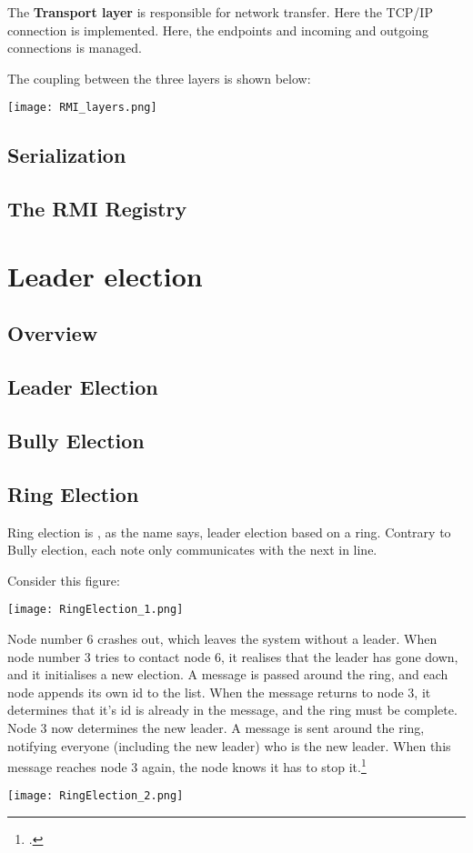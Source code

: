 The \textbf{Transport layer} is responsible for network transfer. Here the TCP/IP connection is implemented. Here, the endpoints and incoming and outgoing connections is managed.

The coupling between the three layers is shown below:

\begin{center}
	\texttt{[image: RMI\_layers.png]}
\end{center}

\subsection{Serialization}

\subsection{The RMI Registry}

\section{Leader election}
\subsection{Overview}

\subsection{Leader Election}

\subsection{Bully Election}

\subsection{Ring Election}
Ring election is , as the name says, leader election based on a ring. Contrary to Bully election, each note only communicates with the next in line.

Consider this figure:

\begin{center}
	\texttt{[image: RingElection\_1.png]}
\end{center}

Node number 6 crashes out, which leaves the system without a leader. When node number 3 tries to contact node 6, it realises that the leader has gone down, and it initialises a new election. A message is passed around the ring, and each node appends its own id to the list. When the message returns to node 3, it determines that it's id is already in the message, and the ring must be complete. Node 3 now determines the new leader. A message is sent around the ring, notifying everyone (including the new leader) who is the new leader. When this message reaches node 3 again, the node knows it has to stop it.\footcite{colostate_RingElec}

\begin{center}
	\texttt{[image: RingElection\_2.png]}
\end{center} 